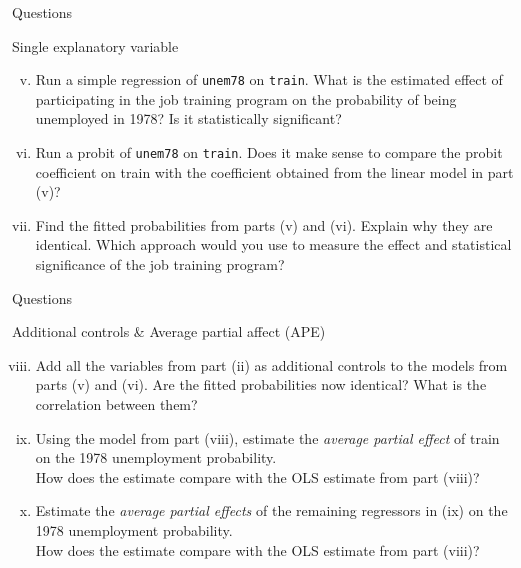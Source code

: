 \documentclass[
  10pt,
  ignorenonframetext,
]{beamer}
\providecommand{\tightlist}{%
  \setlength{\itemsep}{0pt}\setlength{\parskip}{0pt}}
\begin{document}
\begin{frame}[fragile]{Questions}
\protect\hypertarget{questions-1}{}
\begin{block}{Single explanatory variable}
\protect\hypertarget{single-explanatory-variable}{}
\begin{enumerate}
[(a)]
\setcounter{enumi}{21}
\tightlist
\item
  Run a simple regression of \texttt{unem78} on \texttt{train}. What is
  the estimated effect of participating in the job training program on
  the probability of being unemployed in 1978? Is it statistically
  significant?
\end{enumerate}

\begin{enumerate}
[(i)]
\setcounter{enumi}{5}
\item
  Run a probit of \texttt{unem78} on \texttt{train}. Does it make sense
  to compare the probit coefficient on train with the coefficient
  obtained from the linear model in part (v)?
\item
  Find the fitted probabilities from parts (v) and (vi). Explain why
  they are identical. Which approach would you use to measure the effect
  and statistical significance of the job training program?
\end{enumerate}
\end{block}
\end{frame}

\begin{frame}{Questions}
\protect\hypertarget{questions-2}{}
\begin{block}{Additional controls \& Average partial affect (APE)}
\protect\hypertarget{additional-controls-average-partial-affect-ape}{}
\begin{enumerate}
[(i)]
\setcounter{enumi}{7}
\item
  Add all the variables from part (ii) as additional controls to the
  models from parts (v) and (vi). Are the fitted probabilities now
  identical? What is the correlation between them?
\item
  Using the model from part (viii), estimate the \emph{average partial
  effect} of train on the 1978 unemployment probability.\\
  How does the estimate compare with the OLS estimate from part (viii)?
\item
  Estimate the \emph{average partial effects} of the remaining
  regressors in (ix) on the 1978 unemployment probability.\\
  How does the estimate compare with the OLS estimate from part (viii)?
\end{enumerate}
\end{block}
\end{frame}
\end{document}
